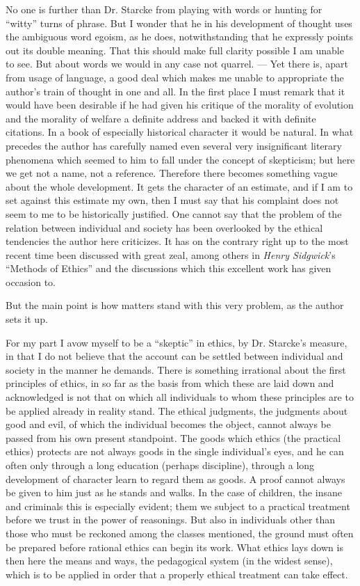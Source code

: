 \documentclass[12pt,a4paper,openany]{book}
\newcommand{\opage}[1]{\marginnote{\footnotesize\textit{[#1]}}}
\begin{document}
No one is further than Dr. Starcke from playing with words
or hunting for ``witty'' turns of phrase. But I wonder
that he in his development of thought uses the ambiguous word
egoism, as he does, notwithstanding that he expressly points
out its double meaning. That this should make
full clarity possible I am unable to see. But about
words we would in any case not quarrel. --- Yet there is,
\opage{33}apart
from usage of language, a good deal which makes me unable to
appropriate the author's train of thought in one and all. In the
first place I must remark that it would have been desirable if
he had given his critique of the morality of evolution and
the morality of welfare a definite address and backed it with definite
citations. In a book of especially historical character it would
be natural. In what precedes the author has carefully
named even several very insignificant literary phenomena
which seemed to him to fall under the concept of skepticism;
but here we get not a name, not a reference. Therefore
there becomes something vague about the whole development. It gets
the character of an estimate, and if I am to set against this estimate
my own, then I must say that his complaint does not seem
to me to be historically justified. One cannot say that the
problem of the relation between individual and society has been
overlooked by the ethical tendencies the author here criticizes.
It has on the contrary right up to the most recent time been discussed
with great zeal, among others in \emph{Henry Sidgwick}'s ``Methods of Ethics''
and the discussions which this excellent work has given
occasion to.

But the main point is how matters stand with
this very problem, as the author sets it up.

For my part I avow myself to be a
``skeptic'' in ethics, by Dr. Starcke's measure, in that I
do not believe that the account can be settled between individual and
society in the manner he demands. There is something
irrational about the first principles of ethics, in so far as the basis
from which these are laid down and acknowledged is not that
on which all individuals to whom these principles are to be
applied already in reality stand. The ethical judgments,
the judgments about good and evil, of which the individual becomes
the object, cannot always be passed from his own
present standpoint. The goods which ethics (the
practical ethics) protects are not always goods in the single
individual's eyes, and he can often only through a long
education (perhaps discipline), through a long development of character
learn to regard them as goods. A proof cannot always be
given to him just as he stands and walks. In the case of children, the
\opage{34}insane and criminals this is especially evident; them we subject
to a practical treatment before we trust in the power of
reasonings. But also in individuals other than those who
must be reckoned among the classes mentioned, the ground must often
be prepared before rational ethics can begin its work. What
ethics lays down is then here the means and ways, the pedagogical
system (in the widest sense), which is to be applied in order that
a properly ethical treatment can take effect.
\end{document}
